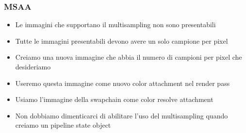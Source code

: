 \begin{frame}
\frametitle{MSAA}
\begin{itemize}
\item Le immagini che supportano il multisampling non sono presentabili
\item Tutte le immagini presentabili devono avere un solo campione per pixel
\item Creiamo una nuova immagine che abbia il numero di campioni per pixel che desideriamo
\item Useremo questa immagine come nuovo color attachment nel render pass
\item Usiamo l'immagine della swapchain come color resolve attachment
\item Non dobbiamo dimenticarci di abilitare l'uso del multisampling quando creiamo un pipeline state object
\end{itemize}
\end{frame}
